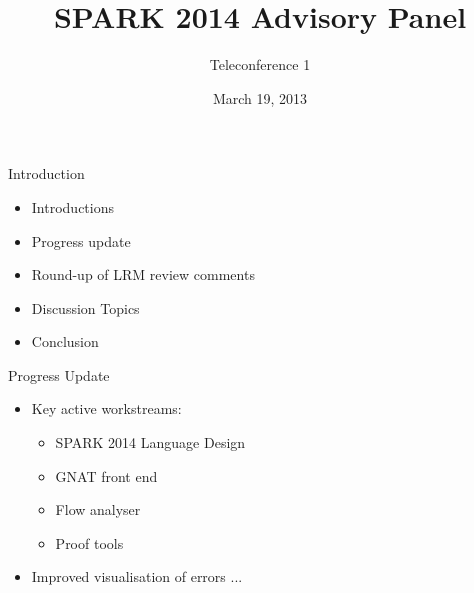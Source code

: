 \documentclass{beamer}
\title{SPARK 2014 Advisory Panel}
\subtitle{Teleconference 1}
\date{March 19, 2013}
\begin{document}
\begin{altrantitle}
\end{altrantitle}

\begin{frame}{Introduction}

  \begin{itemize}

  \item Introductions
  \item Progress update
  \item Round-up of LRM review comments
  \item Discussion Topics
  \item Conclusion

  \end{itemize}

  \end{frame}

\begin{frame}{Progress Update}

  \begin{itemize}

  \item Key active workstreams:
  
    \begin{itemize}
    \item SPARK 2014 Language Design
    \item GNAT front end
    \item Flow analyser
    \item Proof tools
    \end{itemize}

  \item Improved visualisation of errors ...

  \end{itemize}

\end{frame}
\end{document}
